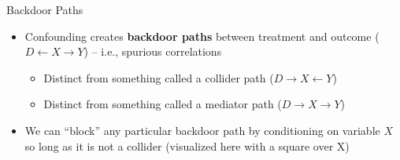 \begin{frame}{Backdoor Paths}

  \begin{itemize}
    \item Confounding creates \textbf{backdoor paths} between treatment and outcome ($D\leftarrow X\rightarrow Y$) -- i.e., spurious correlations
		\begin{itemize}
		\item Distinct from something called a collider path ($D \rightarrow X \leftarrow Y$)
		\item Distinct from something called a mediator path ($D \rightarrow X \rightarrow Y$)
		\end{itemize}
    \item We can ``block'' any particular backdoor path by conditioning on variable $X$ so long as it is not a collider (visualized here with a square over X)

  \end{itemize}

  \begin{center}
  \end{center}

\end{frame}

